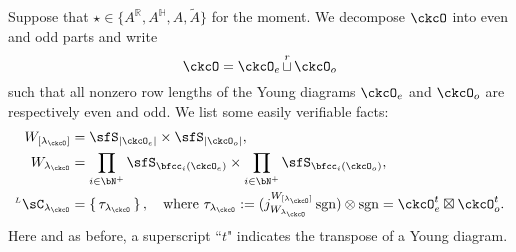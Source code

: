 \documentclass[12pt,a4paper]{amsart}
\def\abs#1{\left|{#1}\right|}
\newcommand{\BH}{{\mathbb {H}}}
\newcommand{\sgn}{\operatorname{sgn}}
\newcommand{\R}{\mathbb R}
\numberwithin{equation}{section}
\newtheorem{defn}[thm]{Definition}
\theoremstyle{remark}
\def\ckG{\check{G}}
\def\ckGc{\check{G}_{\bC}}
\def\dBV{d_{\mathrm{BV}}}
\def\YD{\mathsf{YD}}
\def\lamck{\lambda_\ckcO}
\def\LC{{}^{\scriptscriptstyle L}\sC}
\def\LRC{{}^{\scriptscriptstyle LR}\sC}
\def\AND{\quad \text{and} \quad}
\def\cuprow{{\stackrel{r}{\sqcup}}}
\def\Spr{\mathrm{Springer}}
\def\cuprow{{\,\stackrel{r}{\sqcup}\,}}
\begin{document}
Suppose that $\star\in  \{A^\R, A^\BH, A, \widetilde A\}$ for the moment. We decompose $\ckcO$ into even and odd parts and write %
\[
  \ckcO = \ckcO_{e} \cuprow \ckcO_{o}
\]
such that all nonzero row lengths of the Young diagrams $\ckcO_e$ and   $\ckcO_o$ are respectively even and odd.
We list
some easily verifiable facts:
\begin{equation}\label{eq:WA}
  \begin{split}
    W_{[\lamck]} & = \sfS_{\abs{\ckcO_{e}}}\times \sfS_{\abs{\ckcO_{o}}}, \\
    W_{\lamck} & = \prod_{i\in \bN^{+}}\sfS_{\bfcc_{i}(\ckcO_{e})}\times \prod_{i\in \bN^{+}}\sfS_{\bfcc_{i}(\ckcO_{o})},\\
    \LC_{\lamck} & = \set{\tau_{\lamck}}, \quad \textrm{where }  \tau_{\lamck} := (j_{W_{\lamck}}^{W_{[\lamck]}}\sgn )\otimes \sgn =  \ckcO_{e}^{t}\boxtimes \ckcO_{o}^{t}.
  \end{split}
\end{equation}
Here and as before, a superscript ``$t$" indicates the transpose of a Young diagram. 









\end{document}

